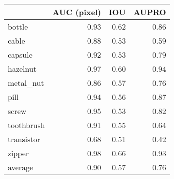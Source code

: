 \begin{tabular}{lrrr}
\toprule
{} &  AUC (pixel) &  IOU &  AUPRO \\
\midrule
bottle     &         0.93 & 0.62 &   0.86 \\
cable      &         0.88 & 0.53 &   0.59 \\
capsule    &         0.92 & 0.53 &   0.79 \\
hazelnut   &         0.97 & 0.60 &   0.94 \\
metal\_nut  &         0.86 & 0.57 &   0.76 \\
pill       &         0.94 & 0.56 &   0.87 \\
screw      &         0.95 & 0.53 &   0.82 \\
toothbrush &         0.91 & 0.55 &   0.64 \\
transistor &         0.68 & 0.51 &   0.42 \\
zipper     &         0.98 & 0.66 &   0.93 \\
average    &         0.90 & 0.57 &   0.76 \\
\bottomrule
\end{tabular}
